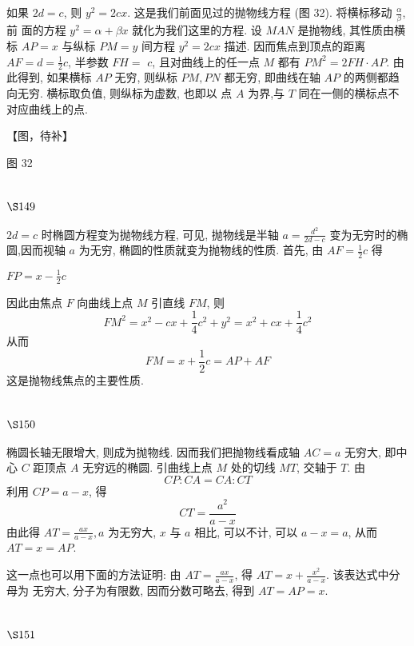 如果 $2 d=c$, 则 $y^{2}=2 c x$. 这是我们前面见过的抛物线方程 (图 32). 将横标移动 $\frac{\alpha}{\beta}$, 前 面的方程 $y^{2}=\alpha+\beta x$ 就化为我们这里的方程. 设 $M A N$ 是抛物线, 其性质由横标 $A P=x$ 与纵标 $P M=y$ 间方程 $y^{2}=2 c x$ 描述. 因而焦点到顶点的距离 $A F=d=\frac{1}{2} c$, 半参数 $F H=$ $c$, 且对曲线上的任一点 $M$ 都有 $P M^{2}=2 F H \cdot A P$. 由此得到, 如果横标 $A P$ 无穷, 则纵标 $P M, P N$ 都无穷, 即曲线在轴 $A P$ 的两侧都趋向无穷. 横标取负值, 则纵标为虚数, 也即以 点 $A$ 为界,与 $T$ 同在一侧的横标点不对应曲线上的点.


【图，待补】

图 32

\section{$\S 149$}

$2 d=c$ 时椭圆方程变为抛物线方程, 可见, 抛物线是半轴 $a=\frac{d^{2}}{2 d-c}$ 变为无穷时的椭 圆,因而视轴 $a$ 为无穷, 椭圆的性质就变为抛物线的性质. 首先, 由 $A F=\frac{1}{2} c$ 得 

$FP=x-\frac{1}{2}c$

因此由焦点 $F$ 向曲线上点 $M$ 引直线 $F M$, 则
\[
F M^{2}=x^{2}-c x+\frac{1}{4} c^{2}+y^{2}=x^{2}+c x+\frac{1}{4} c^{2}
\]
从而
\[
F M=x+\frac{1}{2} c=A P+A F
\]
这是抛物线焦点的主要性质.

\section{$\S 150$}

椭圆长轴无限增大, 则成为抛物线. 因而我们把抛物线看成轴 $A C=a$ 无穷大, 即中心 $C$ 距顶点 $A$ 无穷远的椭圆. 引曲线上点 $M$ 处的切线 $M T$, 交轴于 $T$. 由
\[
C P: C A=C A: C T
\]
利用 $C P=a-x$, 得
\[
C T=\frac{a^{2}}{a-x}
\]
由此得 $A T=\frac{a x}{a-x}, a$ 为无穷大, $x$ 与 $a$ 相比, 可以不计, 可以 $a-x=a$, 从而 $A T=x=A P$.

这一点也可以用下面的方法证明: 由 $A T=\frac{a x}{a-x}$, 得 $A T=x+\frac{x^{2}}{a-x}$. 该表达式中分母为 无穷大, 分子为有限数, 因而分数可略去, 得到 $A T=A P=x$.

\section{$\S 151$}

